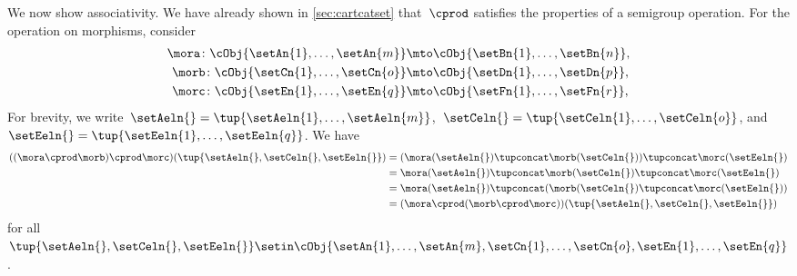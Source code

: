 \begin{example}
    We now show associativity.
    We have already shown in \cref{sec:cartcatset} that~$\cprod$ satisfies the properties of a semigroup operation.
    For the operation on morphisms, consider
    \begin{equation}
        \begin{aligned}
            \mora\colon \cObj{\setAn{1},\ldots,\setAn{m}} & \mto \cObj{\setBn{1}, \ldots, \setBn{n}}, \\
            \morb\colon \cObj{\setCn{1},\ldots,\setCn{o}} & \mto \cObj{\setDn{1},\ldots,\setDn{p}}, \\
            \morc\colon \cObj{\setEn{1},\ldots,\setEn{q}} & \mto \cObj{\setFn{1},\ldots,\setFn{r}},
        \end{aligned}
    \end{equation}
    For brevity, we write~$\setAeln{}=\tup{\setAeln{1},\ldots, \setAeln{m}}$,~$\setCeln{}=\tup{\setCeln{1},\ldots, \setCeln{o}}$, and~$\setEeln{}=\tup{\setEeln{1},\ldots,\setEeln{q}}$.
    We have
    \begin{align}
        ((\mora \cprod \morb)\cprod \morc)(\tup{\setAeln{}, \setCeln{},\setEeln{}})
         & =(\mora(\setAeln{})\tupconcat \morb(\setCeln{}))\tupconcat \morc(\setEeln{}) \\
         & =\mora(\setAeln{})\tupconcat \morb(\setCeln{})\tupconcat \morc(\setEeln{}) \\
         & =\mora(\setAeln{})\tupconcat (\morb(\setCeln{})\tupconcat \morc(\setEeln{})) \\
         & =(\mora \cprod (\morb\cprod \morc))(\tup{\setAeln{}, \setCeln{},\setEeln{}})
    \end{align}
    for all~$\tup{\setAeln{}, \setCeln{},\setEeln{}}\setin \cObj{\setAn{1},\ldots,\setAn{m},\setCn{1},\ldots,\setCn{o},\setEn{1},\ldots,\setEn{q}}$.

\end{example}


